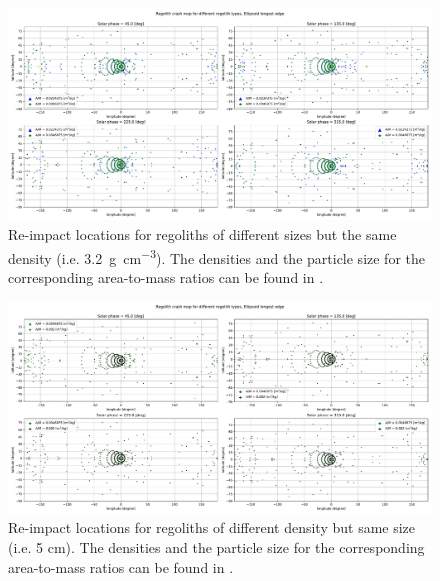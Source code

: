 \documentclass[print]{tudelft-report}
\begin{document}
\begin{appendices}
\begin{figure}[htb]
    \includegraphics[angle=90, width=\textwidth, height=\textheight, keepaspectratio=true]{Results/Images/longest_edge_perturbations/multiple_regolith_types/allPhases_crashMap_3P2_density_1cm_5cm_Radius.pdf}
    \caption{Re-impact locations for regoliths of different sizes but the same density (i.e. \SI{3.2}{\gram\per\centi\metre\cubed}). The densities and the particle size for the corresponding area-to-mass ratios can be found in .}
    \label{fig:crashmap_3.2_density_1cm_5cm_Radius}
    \end{figure}
    \FloatBarrier
    \begin{figure}[htb]
    \centering
    \captionsetup{justification=centering}
    \includegraphics[angle=90, width=\textwidth, height=\textheight, keepaspectratio=true]{Results/Images/longest_edge_perturbations/multiple_regolith_types/allPhases_crashMap_3P2_7P5_density_5cm_Radius.pdf}
    \caption{Re-impact locations for regoliths of different density but same size (i.e. 5 cm). The densities and the particle size for the corresponding area-to-mass ratios can be found in .}
    \label{fig:crashmap_3.2_7.5_density_5cmRadius}
    \end{figure}
    \FloatBarrier

\end{appendices}
\end{document}
